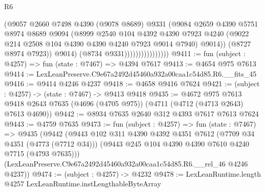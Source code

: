 \begin{lexlean}{R6}
\begin{coremodule}
                                    (@9057
                                      @2660
                                      @7498
                                      @4390
                                      (@9078 @8689)
                                      @9331
                                      (@9084
                                        @2659
                                        @4390
                                        @5751
                                        @8974
                                        @8689
                                        @9094
                                        (@8999
                                          @2540
                                          @104
                                          @4392
                                          @4390
                                          @7923
                                          @4240
                                          (@9022
                                            @214
                                            @2508
                                            @104
                                            @4390
                                            @4390
                                            @4240
                                            @7923
                                            @9014
                                            @7940)
                                          @9014))
                                      (@8727 @8974 @7923))
                                    @9014)
                                  (@8734 @9331))))))))))))))))
@9411 := fun (subject : @4257) => fun (state : @7467) => @4394 @7617
@9413 := @4654 @975 @7613
@9414 := LexLeanPreserve.C9e67a2492d45460a932a00caa1c54d85.R6.__fits_45
@9416 := @9414 @4246 @4237
@9418 := @4658 @9416 @7624
@9421 := (subject : @4257) -> (state : @7467) -> @9413 @9418
@9435 := @4672
    @975
    @7613
    @9418
    @2643
    @7635
    (@4696 (@4705 @975))
    (@4711 (@4712 (@4713 @2643) @7613 @4690))
@9442 := @8934 @7635 @2640 @312 @4393 @7617 @7613 @7624
@9443 := @4759 @7635
@9473 := fun (subject : @4257) =>
  fun (state : @7467) =>
  @9435
    (@9442
      (@9443
        @102
        @311
        @4390
        @4392
        @4351
        @7612
        (@7709 @34 @4351 (@4773 (@7712 @34)))
        (@9443 @245 @104 @4390 @4390 @7610 @4240 @7715 (@4793 @7635)))
      (LexLeanPreserve.C9e67a2492d45460a932a00caa1c54d85.R6.__rel_46 @4246 @4237))
@9474 := (subject : @4257) -> @4232
@9478 := LexLeanRuntime.length @4257 LexLeanRuntime.instLengthableByteArray

\end{coremodule}
\end{lexlean}
